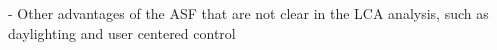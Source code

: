 
- Other advantages of the ASF that are not clear in the LCA analysis, such as daylighting and user centered control 